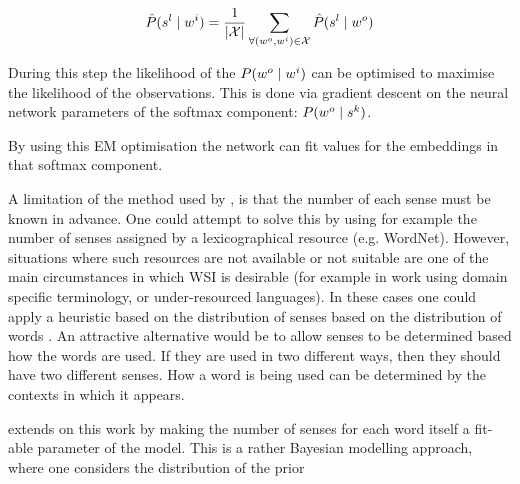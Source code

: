 \documentclass[12pt,parskip]{komatufte}
\begin{document}
\begin{align}
\hat{P}(\n s_l \mid \n w_i) = \frac{1}{\left|\seq X\right|} \sum_{\forall (\n w_o,\n w_i)\in \seq X} \hat{P}(\n s_l \mid \n w_o)
\end{align}

During this step the likelihood of the $P(\n w_o \mid \n w_i)$ can be optimised to maximise the likelihood of the observations.
This is done via gradient descent on the neural network parameters of the softmax component: $P(\n w_o \mid \n s_k)$.

By using this EM optimisation the network can fit values for the embeddings in that softmax component.


A limitation of the method used by \textcite{tian2014probabilistic}, is that the number of each sense must be known in advance.
One could attempt to solve this by using for example the number of senses assigned by a lexicographical resource (e.g. WordNet).
However, situations where such resources are not available or not suitable are one of the main circumstances in which WSI is desirable  (for example in work using domain specific terminology, or under-resourced languages).
In these cases one could apply a heuristic based on the distribution of senses based on the distribution of words \parencite{zipf1945meaning}.
An attractive alternative would be to allow senses to be determined based how the words are used. If they are used in two different ways, then they should have two different senses.
How a word is being used can be determined by the contexts in which it appears.


 extends on this work by making the number of senses for each word itself a fit-able parameter of the model.
This is a rather Bayesian modelling approach, where one considers the distribution of the prior


\end{document}
